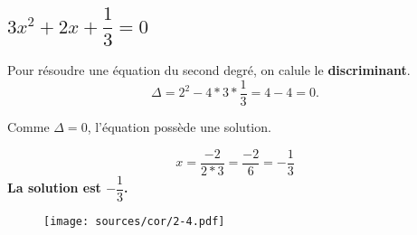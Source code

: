 \documentclass[11pt]{article}
\begin{document}
\begin{multicols}{2}
\subsection{$3x^2 + 2x + \dfrac{1}{3} = 0$}
  Pour résoudre une équation du second degré, on calule le \textbf{discriminant}.
  $$\Delta = 2^2 - 4 * 3 * \frac{1}{3} = 4 - 4 = 0.$$

  Comme $\Delta = 0$, l'équation possède une solution.

  $$x = \dfrac{-2}{2*3} = \dfrac{-2}{6} = -\dfrac{1}{3}$$
  \textbf{La solution est $-\dfrac{1}{3}$.}

  \begin{figure}[H]
    \centering
    \texttt{[image: sources/cor/2-4.pdf]}
  \end{figure}

\end{multicols}
\end{document}
